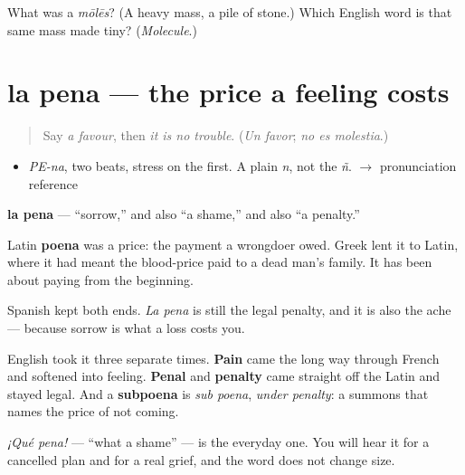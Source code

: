 \begin{tcolorbox}[breakable,colback=teal!4,colframe=teal!35!black,title={Before you move on}]
What was a \emph{mōlēs}? (A heavy mass, a pile of stone.) Which English word is that same mass made tiny? (\emph{Molecule}.)
\end{tcolorbox}
\section[la pena]{la pena — the price a feeling costs}

\label{lesson:ES-C320-pena}



\begin{quote}
Say \emph{a favour}, then \emph{it is no trouble}. (\emph{Un favor}; \emph{no es molestia}.)
\end{quote}

\begin{sounds}
\begin{itemize}
\raggedright
  \item \emph{PE-na}, two beats, stress on the first. A plain \emph{n}, not the \emph{ñ}. $\to$ pronunciation reference
\end{itemize}
\end{sounds}

\begin{cousinweb}
\textbf{la pena} — \textquotedblleft{}sorrow,\textquotedblright{} and also \textquotedblleft{}a shame,\textquotedblright{} and also \textquotedblleft{}a penalty.\textquotedblright{}

Latin \textbf{poena} was a price: the payment a wrongdoer owed. Greek lent it to Latin, where it had meant the blood-price paid to a dead man's family. It has been about paying from the beginning.

Spanish kept both ends. \emph{La pena} is still the legal penalty, and it is also the ache — because sorrow is what a loss costs you.

English took it three separate times. \textbf{Pain} came the long way through French and softened into feeling. \textbf{Penal} and \textbf{penalty} came straight off the Latin and stayed legal. And a \textbf{subpoena} is \emph{sub poena}, \emph{under penalty}: a summons that names the price of not coming.

\emph{¡Qué pena!} — \textquotedblleft{}what a shame\textquotedblright{} — is the everyday one. You will hear it for a cancelled plan and for a real grief, and the word does not change size.
\end{cousinweb}

